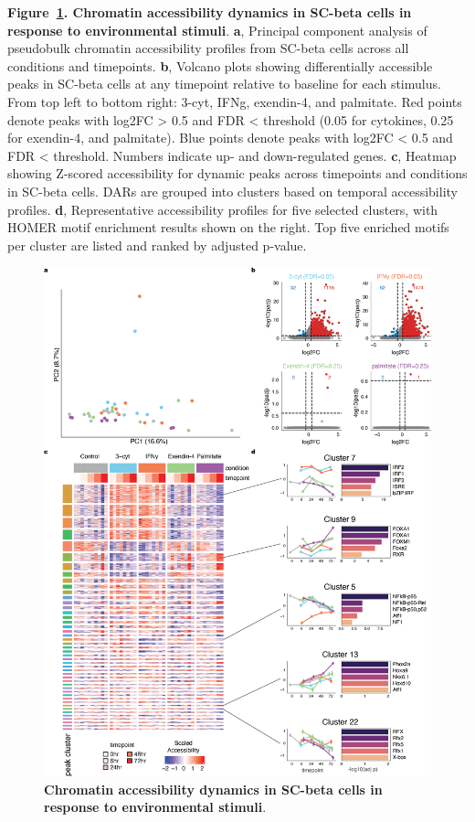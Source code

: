 \clearpage

\thispagestyle{plain}
\noindent
\textbf{Figure~\ref{fig:3 Figure 3}. Chromatin accessibility dynamics in SC-beta cells in response to environmental stimuli}. \textbf{a}, Principal component analysis of pseudobulk chromatin accessibility profiles from SC-beta cells across all conditions and timepoints. \textbf{b}, Volcano plots showing differentially accessible peaks in SC-beta cells at any timepoint relative to baseline for each stimulus. From top left to bottom right: 3-cyt, IFNg, exendin-4, and palmitate. Red points denote peaks with log2FC > 0.5 and FDR < threshold (0.05 for cytokines, 0.25 for exendin-4, and palmitate). Blue points denote peaks with log2FC < 0.5 and FDR < threshold. Numbers indicate up- and down-regulated genes. \textbf{c}, Heatmap showing Z-scored accessibility for dynamic peaks across timepoints and conditions in SC-beta cells. DARs are grouped into clusters based on temporal accessibility profiles. \textbf{d}, Representative accessibility profiles for five selected clusters, with HOMER motif enrichment results shown on the right. Top five enriched motifs per cluster are listed and ranked by adjusted p-value.

\clearpage

\begin{figure}[!htbp]
    \centering
    \includegraphics[height=0.8\textheight, keepaspectratio]{3_figures-and-files/Fig3.png}
    \caption[Chromatin accessibility dynamics in SC-beta cells in response to environmental stimuli]{\textbf{Chromatin accessibility dynamics in SC-beta cells in response to environmental stimuli}.}
    \label{fig:3 Figure 3}
\end{figure}

